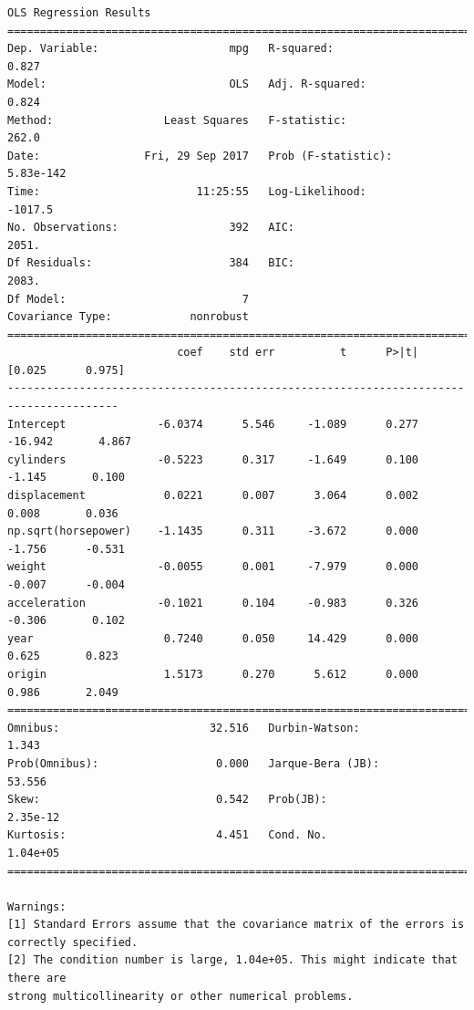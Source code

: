 \documentclass[11pt]{article}
\begin{document}
    \begin{Verbatim}[commandchars=\\\{\}]
                            OLS Regression Results                            
==============================================================================
Dep. Variable:                    mpg   R-squared:                       0.827
Model:                            OLS   Adj. R-squared:                  0.824
Method:                 Least Squares   F-statistic:                     262.0
Date:                Fri, 29 Sep 2017   Prob (F-statistic):          5.83e-142
Time:                        11:25:55   Log-Likelihood:                -1017.5
No. Observations:                 392   AIC:                             2051.
Df Residuals:                     384   BIC:                             2083.
Df Model:                           7                                         
Covariance Type:            nonrobust                                         
=======================================================================================
                          coef    std err          t      P>|t|      [0.025      0.975]
---------------------------------------------------------------------------------------
Intercept              -6.0374      5.546     -1.089      0.277     -16.942       4.867
cylinders              -0.5223      0.317     -1.649      0.100      -1.145       0.100
displacement            0.0221      0.007      3.064      0.002       0.008       0.036
np.sqrt(horsepower)    -1.1435      0.311     -3.672      0.000      -1.756      -0.531
weight                 -0.0055      0.001     -7.979      0.000      -0.007      -0.004
acceleration           -0.1021      0.104     -0.983      0.326      -0.306       0.102
year                    0.7240      0.050     14.429      0.000       0.625       0.823
origin                  1.5173      0.270      5.612      0.000       0.986       2.049
==============================================================================
Omnibus:                       32.516   Durbin-Watson:                   1.343
Prob(Omnibus):                  0.000   Jarque-Bera (JB):               53.556
Skew:                           0.542   Prob(JB):                     2.35e-12
Kurtosis:                       4.451   Cond. No.                     1.04e+05
==============================================================================

Warnings:
[1] Standard Errors assume that the covariance matrix of the errors is correctly specified.
[2] The condition number is large, 1.04e+05. This might indicate that there are
strong multicollinearity or other numerical problems.

    \end{Verbatim}
\end{document}
